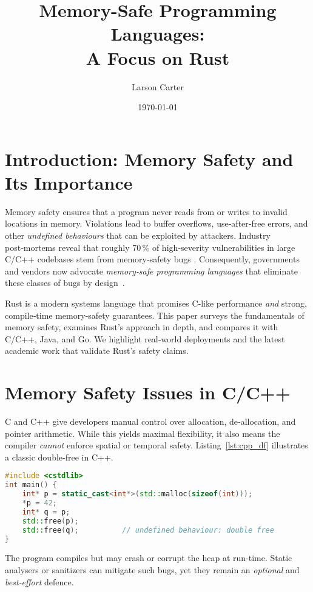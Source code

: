 \documentclass[11pt]{article}
\title{Memory-Safe Programming Languages:\\A Focus on Rust}
\author{Larson Carter}
\date{\today}
\begin{document}
\maketitle
\tableofcontents
\newpage

\section{Introduction: Memory Safety and Its Importance}
Memory safety ensures that a program never reads from or writes to invalid
locations in memory.
Violations lead to buffer overflows, use‑after‑free errors, and other
\emph{undefined behaviours} that can be exploited by attackers.
Industry post‑mortems reveal that roughly 70\,\% of high‑severity
vulnerabilities in large C/C++ codebases stem from memory‑safety bugs
\cite{msrc2019survey,google2022androidReport}.
Consequently, governments and vendors now advocate
\emph{memory‑safe programming languages} that eliminate these classes of bugs
by design~\cite{whitehouse2024memo}.

Rust is a modern systems language that promises C‑like performance \emph{and}
strong, compile‑time memory‑safety guarantees.
This paper surveys the fundamentals of memory safety, examines Rust’s approach
in depth, and compares it with C/C++, Java, and Go.
We highlight real‑world deployments and the latest academic work that validate
Rust’s safety claims.

\section{Memory Safety Issues in C/C++}
C and C++ give developers manual control over allocation, de‑allocation, and
pointer arithmetic.
While this yields maximal flexibility, it also means the compiler
\emph{cannot} enforce spatial or temporal safety.
Listing~\ref{lst:cpp_df} illustrates a classic double‑free in C++.

\begin{lstlisting}[language=C++,caption={Double‑free in C++},label={lst:cpp_df}]
#include <cstdlib>
int main() {
    int* p = static_cast<int*>(std::malloc(sizeof(int)));
    *p = 42;
    int* q = p;
    std::free(p);
    std::free(q);          // undefined behaviour: double free
}
\end{lstlisting}

The program compiles but may crash or corrupt the heap at run‑time.
Static analysers or sanitizers can mitigate such bugs, yet they remain an
\emph{optional} and \emph{best‑effort} defence.
\end{document}
